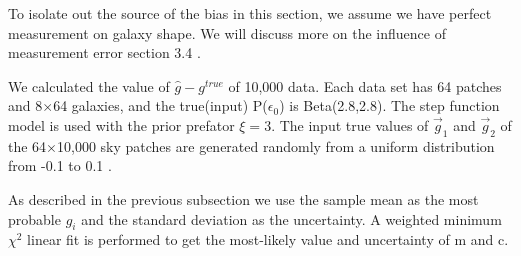 \documentclass[useAMS,usenatbib]{mn2e}
\begin{document}
To isolate out the source of the bias in this section, we assume we have perfect measurement on galaxy shape.
We will discuss more on the influence of measurement error section 3.4 .

We calculated the value of $\hat{g}-g^{true}$ of 10,000 data. Each data set has 64 patches and 8$\times$64 galaxies, and
the true(input) P($\epsilon_{0}$) is Beta(2.8,2.8). The step function model is used with the prior prefator $\xi=3$.
The input true values of $\vec{g}_{1}$ and $\vec{g}_{2}$ of the 64$\times$10,000 sky patches are generated randomly from a uniform distribution from -0.1 to 0.1 . 

As described in the previous subsection we use the sample mean as the most probable $g_{i}$ and 
the standard deviation as the uncertainty. A weighted minimum $\chi^{2}$ linear fit is performed to get the
most-likely value and uncertainty of m and c.
 
\end{document}
